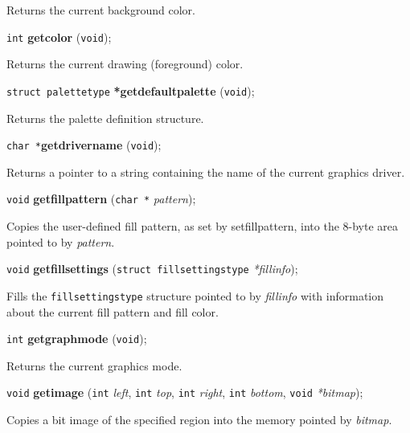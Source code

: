 \documentclass[a4paper,11pt]{article}
\newcommand{\V}{\texttt{void}}      %
\newcommand{\I}{\texttt{int}}       %
\newcommand{\C}{\texttt{char *}}    %
\newcommand{\func}[1]{\textbf{#1}}  %
\newcommand{\A}[1]{\emph{#1}}       %
\newenvironment{bgi}
{ %
  \begin{snugshade}
}
{ %
  \end{snugshade}
}
\begin{document}
Returns the current background color.


\begin{bgi}
\I{} \func{getcolor} (\V{});
\end{bgi}

Returns the current drawing (foreground) color.


\begin{bgi}
\texttt{struct palettetype} \func{*getdefaultpalette} (\V{});
\end{bgi}

Returns the palette definition structure.


\begin{bgi}
\C{}\func{getdrivername} (\V{});
\end{bgi}

Returns a pointer to a string containing the name of the current
graphics driver.


\begin{bgi}
\V{} \func{getfillpattern} (\C{} \A{pattern}); 
\end{bgi}

Copies the user-defined fill pattern, as set by setfillpattern, into
the 8-byte area pointed to by \A{pattern}.


\begin{bgi}
\V{} \func{getfillsettings} (\texttt{struct fillsettingstype}
\A{*fillinfo});
\end{bgi}

Fills the \texttt{fillsettingstype} structure pointed to by
\A{fillinfo} with information about the current fill pattern and fill
color.


\begin{bgi}
\I{} \func{getgraphmode} (\V{});
\end{bgi}

Returns the current graphics mode.


\begin{bgi}
\V{} \func{getimage} (\I{} \A{left}, \I{} \A{top}, \I{} \A{right},
\I{} \A{bottom}, \V{} \A{*bitmap});
\end{bgi}

Copies a bit image of the specified region into the memory pointed by
\A{bitmap}.
\end{document}
